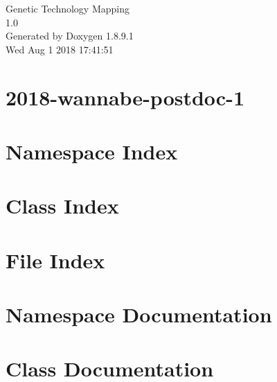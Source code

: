 \documentclass[twoside]{book}
\newcommand{\+}{\discretionary{\mbox{\scriptsize$\hookleftarrow$}}{}{}}
\newcommand{\clearemptydoublepage}{%
  \newpage{\pagestyle{empty}\cleardoublepage}%
}
\begin{document}
\hypersetup{pageanchor=false,
             bookmarks=true,
             bookmarksnumbered=true,
             pdfencoding=unicode
            }
\begin{titlepage}
\vspace*{7cm}
\begin{center}%
{\Large Genetic Technology Mapping \\[1ex]\large 1.\+0 }\\
\vspace*{1cm}
{\large Generated by Doxygen 1.8.9.1}\\
\vspace*{0.5cm}
{\small Wed Aug 1 2018 17:41:51}\\
\end{center}
\end{titlepage}
\clearemptydoublepage
\tableofcontents
\clearemptydoublepage
{}
\hypersetup{pageanchor=true}

\chapter{2018-\/wannabe-\/postdoc-\/1}
\label{md_README}
\hypertarget{md_README}{}

\chapter{Namespace Index}

\chapter{Class Index}

\chapter{File Index}

\chapter{Namespace Documentation}









\chapter{Class Documentation}







\end{document}
